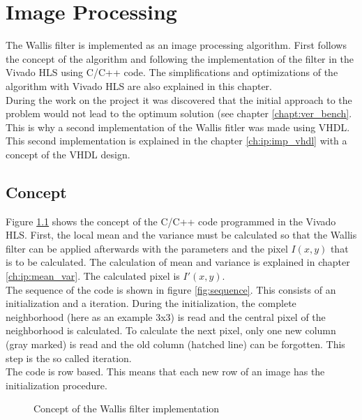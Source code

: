 %
%
\chapter{Image Processing}  \label{chapt:image_processing}
The Wallis filter is implemented as an image processing algorithm. First follows the concept of the algorithm and following the implementation of the filter in the Vivado HLS using C/C++ code. The simplifications and optimizations of the algorithm with Vivado HLS are also explained in this chapter. \\
During the work on the project it was discovered that the initial approach to the problem would not lead to the optimum solution (see chapter \ref{chapt:ver_bench}. This is why a second implementation of the Wallis fitler was made using VHDL. This second implementation is explained in the chapter \ref{ch:ip:imp_vhdl} with a concept of the VHDL design.

\section{Concept} \label{ch:ip:concept}
Figure \ref{fig:concept} shows the concept of the C/C++ code programmed in the Vivado HLS. First, the local mean and the variance must be calculated so that the Wallis filter can be applied afterwards with the parameters and the pixel $I(x,y)$ that is to be calculated. The calculation of mean and variance is explained in chapter \ref{ch:ip:mean_var}. The calculated pixel is $I'(x,y)$. \\
The sequence of the code is shown in figure \ref{fig:sequence}. This consists of an initialization and a iteration. During the initialization, the complete neighborhood (here as an example 3x3) is read and the central pixel of the neighborhood is calculated. To calculate the next pixel, only one new column (gray marked) is read and the old column (hatched line) can be forgotten. This step is the so called iteration.\\
The code is row based. This means that each new row of an image has the initialization procedure.

\begin{figure}[tb!]
    \centering
    \begin{adjustbox}{max width=\textwidth}
        
    \end{adjustbox}
    \caption{Concept of the Wallis filter implementation}
    \label{fig:concept}
\end{figure}

